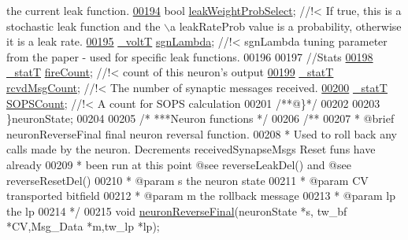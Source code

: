 \begin{DoxyCode}
{       the current leak function.}
\hypertarget{neuron_8h_source_l00194}{}\hyperlink{structneuron_state_a20889d9b55895bcc719d6aad2766b8f8}{00194}     \textcolor{keywordtype}{bool} \hyperlink{structneuron_state_a20889d9b55895bcc719d6aad2766b8f8}{leakWeightProbSelect}; \textcolor{comment}{//!< If true, this is a stochastic leak
       function and the \(\backslash\)a leakRateProb value is a probability, otherwise it is a leak rate.}
\hypertarget{neuron_8h_source_l00195}{}\hyperlink{structneuron_state_a46a71f61511b5311e14643084109d90f}{00195}     \hyperlink{assist_8h_abe1fc1b8f9efd1187e564bcb8de7f815}{\_voltT} \hyperlink{structneuron_state_a46a71f61511b5311e14643084109d90f}{sgnLambda}; \textcolor{comment}{//!< sgnLambda tuning parameter from the paper - used for
       specific leak functions.}
00196 
00197         \textcolor{comment}{//Stats}
\hypertarget{neuron_8h_source_l00198}{}\hyperlink{structneuron_state_afe8825076c4cf3863c677307fec63c61}{00198}     \hyperlink{assist_8h_ad77e6fc5a9b03d46e7c97b7c4b92e89f}{\_statT} \hyperlink{structneuron_state_afe8825076c4cf3863c677307fec63c61}{fireCount}; \textcolor{comment}{//!< count of this neuron's output}
\hypertarget{neuron_8h_source_l00199}{}\hyperlink{structneuron_state_ab8f63a1dfdb2992657530ff8a63fdc01}{00199}     \hyperlink{assist_8h_ad77e6fc5a9b03d46e7c97b7c4b92e89f}{\_statT} \hyperlink{structneuron_state_ab8f63a1dfdb2992657530ff8a63fdc01}{rcvdMsgCount}; \textcolor{comment}{//!<  The number of synaptic messages received.}
\hypertarget{neuron_8h_source_l00200}{}\hyperlink{structneuron_state_a71fbb9a79e8048b473b6e09d29a64bbe}{00200}     \hyperlink{assist_8h_ad77e6fc5a9b03d46e7c97b7c4b92e89f}{\_statT} \hyperlink{structneuron_state_a71fbb9a79e8048b473b6e09d29a64bbe}{SOPSCount}; \textcolor{comment}{//!<  A count for SOPS calculation}
00201 \textcolor{comment}{/**@\}*/}
00202 
00203 \}neuronState;
00204 
00205 \textcolor{comment}{/* ***Neuron functions */}
00206 \textcolor{comment}{/**}
00207 \textcolor{comment}{ * @brief neuronReverseFinal final neuron reversal function.}
00208 \textcolor{comment}{ * Used to roll back any calls made by the neuron. Decrements receivedSynapseMsgs Reset funs have
       already}
00209 \textcolor{comment}{ * been run at this point @see reverseLeakDel() and @see reverseResetDel()}
00210 \textcolor{comment}{ * @param s the neuron state}
00211 \textcolor{comment}{ * @param CV transported bitfield}
00212 \textcolor{comment}{ * @param m the rollback message}
00213 \textcolor{comment}{ * @param lp the lp}
00214 \textcolor{comment}{ */}
00215 \textcolor{keywordtype}{void} \hyperlink{neuron_8h_a01dcc8e3f0132786bd59ecb847013284}{neuronReverseFinal}(neuronState *s, tw\_bf *CV,Msg\_Data *m,tw\_lp *lp);

\end{DoxyCode}
